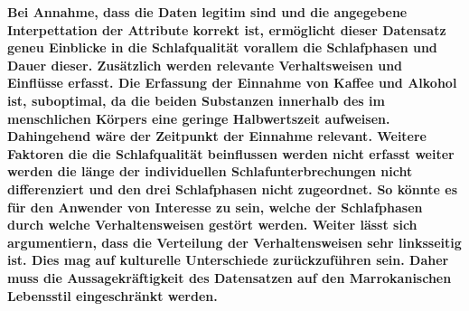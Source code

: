 \documentclass[usegeometry=true]{scrartcl}
\begin{document}
\textbf{Bei Annahme, dass die Daten legitim sind und die  angegebene Interpettation der Attribute korrekt ist, ermöglicht dieser Datensatz geneu Einblicke in die Schlafqualität vorallem die Schlafphasen und Dauer dieser. Zusätzlich werden relevante Verhaltsweisen und Einflüsse erfasst. Die Erfassung der Einnahme von Kaffee und Alkohol ist, suboptimal, da die beiden Substanzen innerhalb des im menschlichen Körpers eine geringe Halbwertszeit aufweisen. Dahingehend wäre der Zeitpunkt der Einnahme relevant. Weitere Faktoren die die Schlafqualität beinflussen werden nicht erfasst weiter werden die länge der individuellen Schlafunterbrechungen nicht differenziert und den drei Schlafphasen nicht zugeordnet. So könnte es für den Anwender von Interesse zu sein, welche der Schlafphasen durch welche Verhaltensweisen gestört werden. Weiter lässt sich argumentiern, dass die Verteilung der Verhaltensweisen sehr linksseitig ist. Dies mag auf kulturelle Unterschiede zurückzuführen sein. Daher muss die Aussagekräftigkeit des Datensatzen auf den Marrokanischen Lebensstil eingeschränkt werden.}
\end{document}
